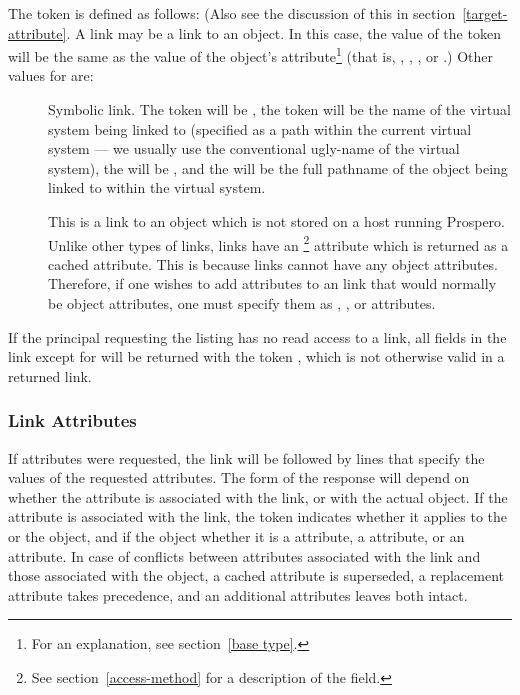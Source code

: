 The  token is defined as follows: \label{target-token}(Also see
the discussion of this in section~\ref{target-attribute}.
A link may be a link to an object.  In this case, the value of the
 token will be the same as the value of the
object's  attribute\footnote{For an explanation, see
section~\ref{base type}.}
(that is, , ,
, or .)  Other values for
 are:
\begin{description}
\item[] Symbolic link.  The  token will be
  , the  token will be the name of
 the virtual system being linked to (specified as a path within the
 current virtual system --- we usually use the conventional ugly-name of
 the virtual system), the  will be ,
 and the  will be 
 the full pathname of the object being linked to within the virtual
 system.

\item[] This is a link to an object which is not stored on a
host running Prospero.   Unlike other types of links, 
links have an %
\footnote{See
 section~\ref{access-method} for a description of the
  field.} 
attribute which is returned as a cached attribute.
This is because  links
cannot have any object attributes.  Therefore, if one wishes to add
attributes to an  link that would normally be object
attributes, one must specify them as , , or
 attributes.
\end{description}


If the principal requesting the listing has no read access to a link,
all fields in the link except for  will be
returned with the token , which is not otherwise valid in a
returned link.

\subsubsection{Link Attributes\label{Link Attributes}}

If attributes were requested, the link will be followed by lines that
specify the values of the requested attributes.  The form of the
response will depend on whether the attribute is associated with the
link, or with the actual object.  If the attribute is associated with
the link, the  token indicates whether it applies to the
 or the object, and if the object whether it is a 
attribute, a  attribute, or an  attribute.  In
case of conflicts between attributes associated with the link and
those associated with the object, a cached attribute is superseded, a
replacement attribute takes precedence, and an additional attributes
leaves both intact.  

